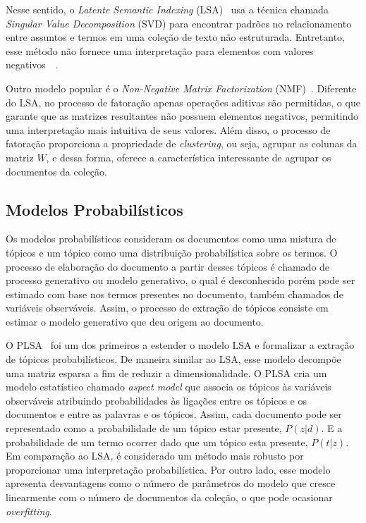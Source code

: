 Nesse sentido, o \textit{Latente Semantic Indexing} (LSA)~\cite{Deerwester1990} usa a técnica chamada \textit{Singular Value Decomposition} (SVD) para encontrar padrões no relacionamento entre assuntos e termos em uma coleção de texto não estruturada. Entretanto, esse método não fornece uma interpretação para elementos com valores negativos~\cite{Deerwester1990}~\cite{Cheng2013}. %

Outro modelo popular é o \textit{Non-Negative Matrix Factorization} (NMF)~\cite{Lee1999}.  Diferente do LSA, no processo de fatoração apenas operações aditivas são permitidas, o que garante que as matrizes resultantes não possuem elementos negativos, permitindo uma interpretação mais intuitiva de seus valores. Além disso, o processo de fatoração proporciona a propriedade de \textit{clustering}, ou seja, agrupar as colunas da matriz $W$, e dessa forma, oferece a característica interessante de agrupar os documentos da coleção.  %


\subsection{Modelos Probabilísticos}

Os modelos probabilísticos consideram os documentos como uma mistura de tópicos e um tópico como uma distribuição probabilística sobre os termos. O processo de elaboração do documento a partir desses tópicos é chamado de processo generativo ou modelo generativo, o qual é desconhecido porém pode ser estimado com base nos termos presentes no documento, também chamados de variáveis observáveis. Assim, o processo de extração de tópicos consiste em estimar o modelo generativo que deu origem ao documento.
 
O PLSA~\cite{Hofmann1999} foi um dos primeiros a estender o modelo LSA e formalizar a extração de tópicos probabilísticos. De maneira similar ao LSA, esse modelo decompõe uma matriz esparsa a fim de reduzir a dimensionalidade. O PLSA cria um modelo estatístico chamado \textit{aspect model} que associa os tópicos às variáveis observáveis atribuindo probabilidades às ligações entre os tópicos e os documentos e entre as palavras e os tópicos. Assim, cada documento pode ser representado como a probabilidade de um tópico estar presente, $P(z|d)$. E a probabilidade de um termo ocorrer dado que um tópico esta presente, $P(t|z)$. Em comparação ao LSA, é considerado um método mais robusto por proporcionar uma interpretação probabilística. Por outro lado, esse modelo apresenta desvantagens como o número de parâmetros do modelo que cresce linearmente com o número de documentos da coleção, o que pode ocasionar \textit{overfitting}.   %

